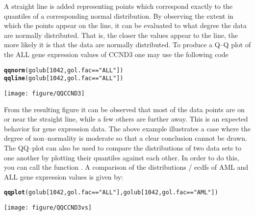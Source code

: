 \documentclass{article}\usepackage[]{graphicx}\usepackage[usenames,dvipsnames]{color}
\makeatletter
\def\maxwidth{ %
  \ifdim\Gin@nat@width>\linewidth
    \linewidth
  \else
    \Gin@nat@width
  \fi
}
\newcommand{\hlnum}[1]{\textcolor[rgb]{0.686,0.059,0.569}{#1}}%
\newcommand{\hlstr}[1]{\textcolor[rgb]{0.192,0.494,0.8}{#1}}%
\newcommand{\hlopt}[1]{\textcolor[rgb]{0,0,0}{#1}}%
\newcommand{\hlstd}[1]{\textcolor[rgb]{0.345,0.345,0.345}{#1}}%
\newcommand{\hlkwd}[1]{\textcolor[rgb]{0.737,0.353,0.396}{\textbf{#1}}}%
\newenvironment{kframe}{%
 \def\at@end@of@kframe{}%
 \ifinner\ifhmode%
  \def\at@end@of@kframe{\end{minipage}}%
  \begin{minipage}{\columnwidth}%
 \fi\fi%
 \def\FrameCommand##1{\hskip\@totalleftmargin \hskip-\fboxsep
 \colorbox{shadecolor}{##1}\hskip-\fboxsep
     \hskip-\linewidth \hskip-\@totalleftmargin \hskip\columnwidth}%
 \MakeFramed {\advance\hsize-\width
   \@totalleftmargin\z@ \linewidth\hsize
   \@setminipage}}%
 {\par\unskip\endMakeFramed%
 \at@end@of@kframe}
\newenvironment{knitrout}{}{} %
\makeatother
\begin{document}
A straight line is added representing points which
correspond exactly to the quantiles of a corresponding normal distribution. 
By observing the extent in which the points appear on the line, it can be evaluated to
what degree the data are normally distributed. That is, the closer the  
values appear to the line, the more likely it is that the data are
normally distributed. To produce a Q--Q plot of the ALL gene expression values
of CCND3  one may use the following code \\


\begin{knitrout}
\color{fgcolor}\begin{kframe}
\begin{alltt}
\hlkwd{qqnorm}\hlstd{(golub[}\hlnum{1042}\hlstd{, gol.fac}\hlopt{==}\hlstr{"ALL"}\hlstd{])}
\hlkwd{qqline}\hlstd{(golub[}\hlnum{1042}\hlstd{, gol.fac}\hlopt{==}\hlstr{"ALL"}\hlstd{])}
\end{alltt}
\end{kframe}
\texttt{[image: figure/QQCCND3]} 

\end{knitrout}

From the resulting figure it can be observed that most of the data points
are on or near the straight line, while a few others are further away.
This is an expected behavior for gene expression data. The above example 
illustrates a case where the degree of non--normality
is moderate so that a clear conclusion cannot be drawn. \\

The QQ--plot can  also be used to compare the distributions of 
two data sets to one another by plotting their quantiles against each other. 
In order to do this, you can call the function . A comparison
of the distributions / ecdfs of AML and ALL gene expression values is given by:

\begin{knitrout}
\color{fgcolor}\begin{kframe}
\begin{alltt}
\hlkwd{qqplot}\hlstd{(golub[}\hlnum{1042}\hlstd{, gol.fac}\hlopt{==}\hlstr{"ALL"}\hlstd{], golub[}\hlnum{1042}\hlstd{, gol.fac}\hlopt{==}\hlstr{"AML"}\hlstd{])}
\end{alltt}
\end{kframe}
\texttt{[image: figure/QQCCND3vs]} 

\end{knitrout}
\end{document}
